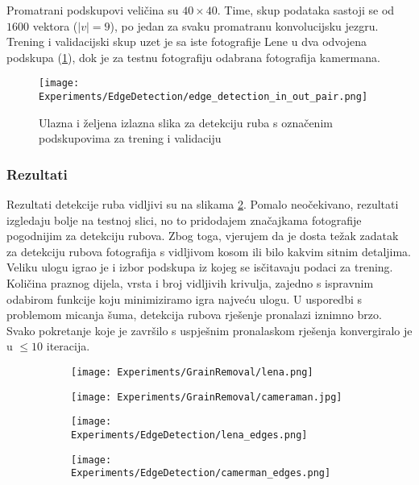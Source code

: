 Promatrani podskupovi veličina su $40 \times 40$.
Time, skup podataka sastoji se od $1600$ vektora ($|v| = 9$), po jedan za svaku promatranu konvolucijsku jezgru.
Trening i validacijski skup uzet je sa iste fotografije Lene u dva odvojena podskupa (\ref{fig:edge_detection_in_out_pair_example}), dok je za testnu fotografiju odabrana fotografija kamermana.

\begin{figure}
	\centering
	\texttt{[image: Experiments/EdgeDetection/edge\_detection\_in\_out\_pair.png]}
	\caption{Ulazna i željena izlazna slika za detekciju ruba s označenim podskupovima za trening i validaciju}
	\label{fig:edge_detection_in_out_pair_example}
\end{figure}

\subsubsection{Rezultati}
Rezultati detekcije ruba vidljivi su na slikama \ref{fig:edge_detection_results}. %
Pomalo neočekivano, rezultati izgledaju bolje na testnoj slici, no to pridodajem značajkama fotografije pogodnijim za detekciju rubova.
Zbog toga, vjerujem da je dosta težak zadatak za detekciju rubova fotografija s vidljivom kosom ili bilo kakvim sitnim detaljima.
Veliku ulogu igrao je i izbor podskupa iz kojeg se isčitavaju podaci za trening.
Količina praznog dijela, vrsta i broj vidljivih krivulja, zajedno s ispravnim odabirom funkcije koju minimiziramo igra najveću ulogu.
U usporedbi s problemom micanja šuma, detekcija rubova rješenje pronalazi iznimno brzo.
Svako pokretanje koje je završilo s uspješnim pronalaskom rješenja konvergiralo je u $\leq 10$ iteracija.

\begin{figure}
	\centering
	\caption{Fotografije Lene i Kamermana prije i nakon detekcije rubova}
	\begin{subfigure}[t]{0.48\textwidth}
		\texttt{[image: Experiments/GrainRemoval/lena.png]}
	\end{subfigure}
	\begin{subfigure}[t]{0.48\textwidth}
		\texttt{[image: Experiments/GrainRemoval/cameraman.jpg]}
	\end{subfigure}
	\begin{subfigure}[t]{0.48\textwidth}
		\texttt{[image: Experiments/EdgeDetection/lena\_edges.png]}
	\end{subfigure}
	\begin{subfigure}[t]{0.48\textwidth}
		\texttt{[image: Experiments/EdgeDetection/camerman\_edges.png]}
	\end{subfigure}
	\label{fig:edge_detection_results}
\end{figure}

